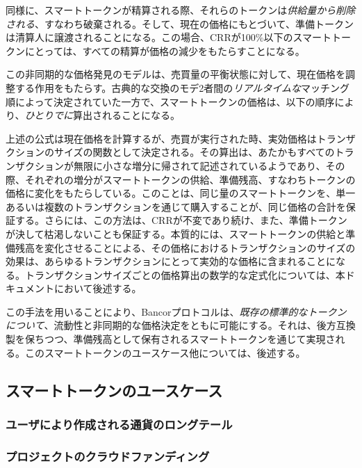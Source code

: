 \documentclass{jsarticle}
\begin{document}
  同様に、スマートトークンが精算される際、それらのトークンは\emph{供給量から削除される}、すなわち破棄される。そして、現在の価格にもとづいて、準備トークンは清算人に譲渡されることになる。この場合、CRRが100\%以下のスマートトークンにとっては、すべての精算が価格の減少をもたらすことになる。

  この非同期的な価格発見のモデルは、売買量の平衡状態に対して、現在価格を調整する作用をもたらす。古典的な交換のモデ2者間の\emph{リアルタイムな}マッチング順によって決定されていた一方で、スマートトークンの価格は、以下の順序により、\emph{ひとりでに}算出されることになる。

  上述の公式は現在価格を計算するが、売買が実行された時、実効価格はトランザクションのサイズの関数として決定される。その算出は、あたかもすべてのトランザクションが無限に小さな増分に帰されて記述されているようであり、その際、それぞれの増分がスマートトークンの供給、準備残高、すなわちトークンの価格に変化をもたらしている。このことは、同じ量のスマートトークンを、単一あるいは複数のトランザクションを通じて購入することが、同じ価格の合計を保証する。さらには、この方法は、CRRが不変であり続け、また、準備トークンが決して枯渇しないことも保証する。本質的には、スマートトークンの供給と準備残高を変化させることによる、その価格におけるトランザクションのサイズの効果は、あらゆるトランザクションにとって実効的な価格に含まれることになる。トランザクションサイズごとの価格算出の数学的な定式化については、本ドキュメントにおいて後述する。

  この手法を用いることにより、Bancorプロトコルは、\emph{既存の標準的なトークンについて}、流動性と非同期的な価格決定をともに可能にする。それは、後方互換製を保ちつつ、準備残高として保有されるスマートトークンを通じて実現される。このスマートトークンのユースケース他については、後述する。

  \subsection{スマートトークンのユースケース}



    \subsubsection{ユーザにより作成される通貨のロングテール}



    \subsubsection{プロジェクトのクラウドファンディング}
\end{document}
